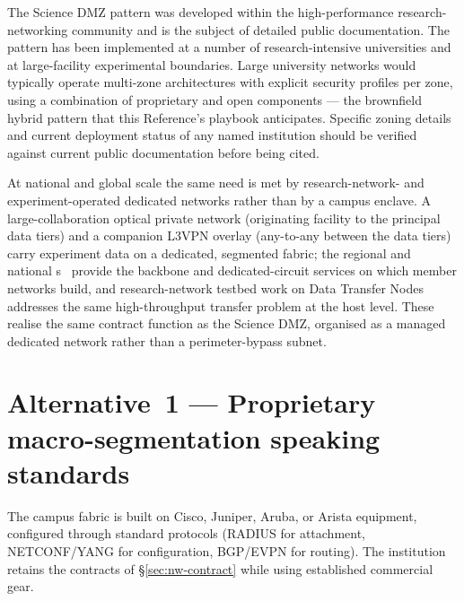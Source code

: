 \begin{realworldbox}
\noindent The Science DMZ pattern was developed within the
high-performance research-networking community and is the
subject of detailed public documentation. The pattern has been
implemented at a number of research-intensive universities and at
large-facility experimental boundaries. Large university networks
would typically operate multi-zone architectures with explicit
security profiles per zone, using a combination of proprietary and
open components --- the brownfield hybrid pattern that this Reference's
playbook anticipates. Specific zoning details and current deployment
status of any named institution should be verified against current
public documentation before being cited.
\end{realworldbox}

\begin{realworldbox}
\noindent At national and global scale the same need is met by
research-network- and experiment-operated dedicated networks rather
than by a campus enclave. A large-collaboration optical private
network (originating facility to the principal data tiers) and a
companion L3VPN overlay (any-to-any between the data
tiers)~\cite{cern-lhcone, cern-wlcg} carry experiment data on a
dedicated, segmented fabric; the regional and national
s~\cite{geant} provide the backbone and
dedicated-circuit services on which member networks build, and
research-network testbed work on Data Transfer
Nodes~\cite{geant-dtn} addresses the same high-throughput transfer
problem at the host level. These realise the same contract function as
the Science DMZ, organised as a managed dedicated network rather than
a perimeter-bypass subnet.
\end{realworldbox}

\section{Alternative~1 --- Proprietary macro-segmentation speaking standards}
\label{sec:nw-alt1}

\begin{alternativebox}
\noindent The campus fabric is built on Cisco, Juniper, Aruba, or
Arista equipment, configured through standard protocols (RADIUS for
attachment, NETCONF/YANG for configuration, BGP/EVPN for routing).
The institution retains the contracts of \S\ref{sec:nw-contract}
while using established commercial gear.
\end{alternativebox}

